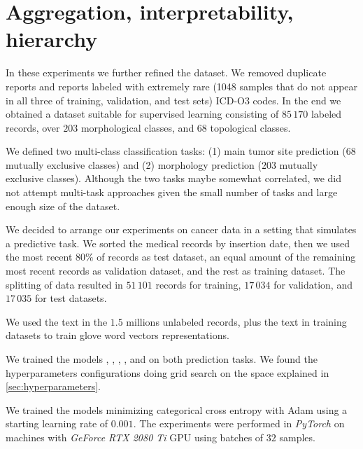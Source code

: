 \section{Aggregation, interpretability, hierarchy}
\label{ch:icdo}
In these experiments we further refined the dataset. We removed duplicate
reports and reports labeled with extremely rare (1048
samples that do not
appear in all three of training, validation, and test sets) ICD-O3
codes. In the end we
obtained 
a dataset suitable for supervised learning consisting of $85\,170$
labeled records, over $203$ morphological classes, and $68$
topological classes.

We defined two multi-class classification tasks: (1) main tumor site
prediction ($68$ mutually exclusive classes) and (2) morphology
prediction ($203$ mutually exclusive
classes). Although the two tasks maybe somewhat correlated, we did not
attempt multi-task approaches given the small number of tasks and
large enough size of the dataset.

We decided to arrange our experiments on cancer
data in 
a setting that simulates a predictive task. We sorted the medical
records by insertion date, then we used the most recent $80\%$ of
records as test 
dataset, an equal amount of the remaining most recent records as
validation dataset, and the rest as training dataset. The splitting of
data resulted in $51\,101$ records for training,
$17\,034$ for validation, and $17\,035$ for test datasets.

We used the text in the $1.5$ millions unlabeled records, plus the
text in training datasets to train \ac{glove} word
vectors representations.

We trained the models \maxp{}, \softmax{}, \maxi{}, \maxh{}, and
\softmaxh{} on both prediction tasks. We found the hyperparameters 
configurations doing grid search on the space explained in
\cref{sec:hyperparameters}. 

We trained the models minimizing categorical cross entropy with Adam
\cite{kingma2014adam} using a starting learning rate of $0.001$. The
experiments were performed in \emph{PyTorch} on machines with
\emph{GeForce RTX 2080 Ti} 
GPU using batches of $32$ samples.

